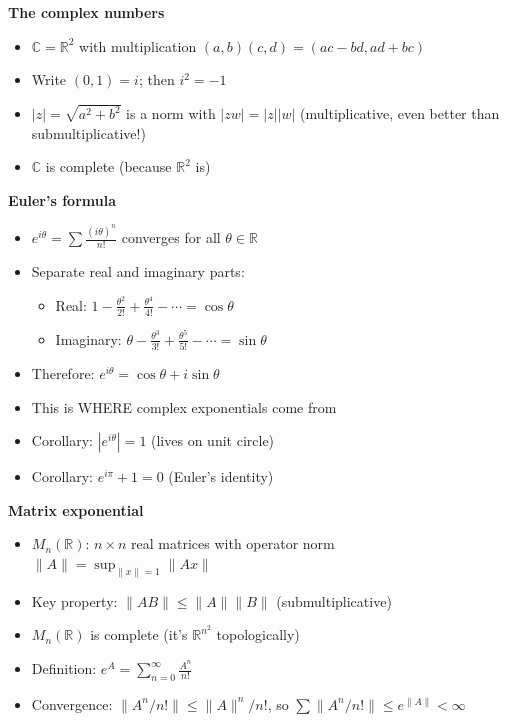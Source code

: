 \documentclass[
  10pt,
  letterpaper,
]{scrbook}
\providecommand{\tightlist}{%
  \setlength{\itemsep}{0pt}\setlength{\parskip}{0pt}}
\begin{document}
\textbf{The complex numbers}

\begin{itemize}
\tightlist
\item
  \(\mathbb{C} = \mathbb{R}^2\) with multiplication
  \((a,b)(c,d) = (ac - bd, ad + bc)\)
\item
  Write \((0,1) = i\); then \(i^2 = -1\)
\item
  \(|z| = \sqrt{a^2 + b^2}\) is a norm with \(|zw| = |z||w|\)
  (multiplicative, even better than submultiplicative!)
\item
  \(\mathbb{C}\) is complete (because \(\mathbb{R}^2\) is)
\end{itemize}

\textbf{Euler's formula}

\begin{itemize}
\tightlist
\item
  \(e^{i\theta} = \sum \frac{(i\theta)^n}{n!}\) converges for all
  \(\theta \in \mathbb{R}\)
\item
  Separate real and imaginary parts:

  \begin{itemize}
  \tightlist
  \item
    Real:
    \(1 - \frac{\theta^2}{2!} + \frac{\theta^4}{4!} - \cdots = \cos\theta\)
  \item
    Imaginary:
    \(\theta - \frac{\theta^3}{3!} + \frac{\theta^5}{5!} - \cdots = \sin\theta\)
  \end{itemize}
\item
  Therefore: \(e^{i\theta} = \cos\theta + i\sin\theta\)
\item
  This is WHERE complex exponentials come from
\item
  Corollary: \(|e^{i\theta}| = 1\) (lives on unit circle)
\item
  Corollary: \(e^{i\pi} + 1 = 0\) (Euler's identity)
\end{itemize}

\textbf{Matrix exponential}

\begin{itemize}
\tightlist
\item
  \(M_n(\mathbb{R})\): \(n \times n\) real matrices with operator norm
  \(\|A\| = \sup_{\|x\|=1} \|Ax\|\)
\item
  Key property: \(\|AB\| \leq \|A\| \|B\|\) (submultiplicative)
\item
  \(M_n(\mathbb{R})\) is complete (it's \(\mathbb{R}^{n^2}\)
  topologically)
\item
  Definition: \(e^A = \sum_{n=0}^\infty \frac{A^n}{n!}\)
\item
  Convergence: \(\|A^n/n!\| \leq \|A\|^n/n!\), so
  \(\sum \|A^n/n!\| \leq e^{\|A\|} < \infty\)
\end{itemize}
\end{document}

